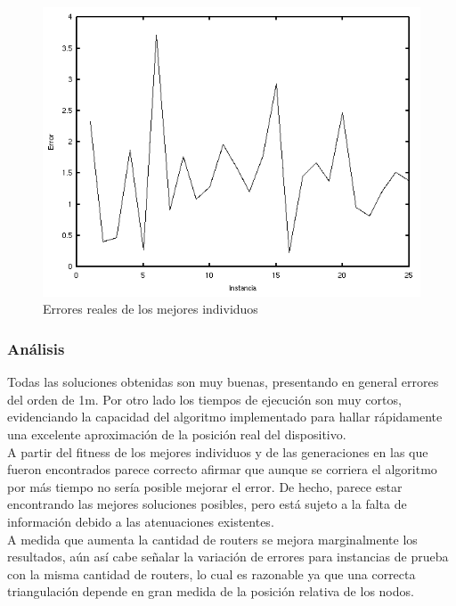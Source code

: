 \documentclass[journal]{IEEEtran}
\begin{document}
\begin{figure}[h]
\centering
\includegraphics[width=\linewidth]{errors.png}
\caption{Errores reales de los mejores individuos}
\label{fig:errors}
\end{figure}

\subsubsection*{Análisis}

Todas las soluciones obtenidas son muy buenas, presentando en general errores del orden de 1m. Por otro lado los tiempos de ejecución son muy cortos, evidenciando la capacidad del algoritmo implementado para hallar rápidamente una excelente aproximación de la posición real del dispositivo.\\

A partir del fitness de los mejores individuos y de las generaciones en las que fueron encontrados parece correcto afirmar que aunque se corriera el algoritmo por más tiempo no sería posible mejorar el error. De hecho, parece estar encontrando las mejores soluciones posibles, pero está sujeto a la falta de información debido a las atenuaciones existentes.\\

A medida que aumenta la cantidad de routers se mejora marginalmente los resultados, aún así cabe señalar la variación de errores para instancias de prueba con la misma cantidad de routers, lo cual es razonable ya que una correcta triangulación depende en gran medida de la posición relativa de los nodos.\\
\end{document}
